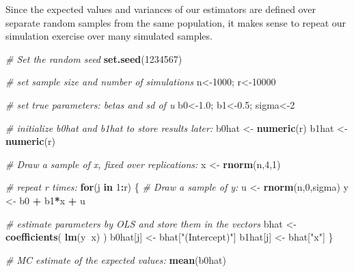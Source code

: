 \documentclass[]{book}
\newenvironment{Shaded}{\begin{snugshade}}{\end{snugshade}}
\newcommand{\CommentTok}[1]{\textcolor[rgb]{0.56,0.35,0.01}{\textit{#1}}}
\newcommand{\ControlFlowTok}[1]{\textcolor[rgb]{0.13,0.29,0.53}{\textbf{#1}}}
\newcommand{\DecValTok}[1]{\textcolor[rgb]{0.00,0.00,0.81}{#1}}
\newcommand{\FloatTok}[1]{\textcolor[rgb]{0.00,0.00,0.81}{#1}}
\newcommand{\KeywordTok}[1]{\textcolor[rgb]{0.13,0.29,0.53}{\textbf{#1}}}
\newcommand{\NormalTok}[1]{#1}
\newcommand{\OperatorTok}[1]{\textcolor[rgb]{0.81,0.36,0.00}{\textbf{#1}}}
\newcommand{\StringTok}[1]{\textcolor[rgb]{0.31,0.60,0.02}{#1}}
\begin{document}
Since the expected values and variances of our estimators are defined over separate random samples from the same population, it makes sense to repeat our simulation exercise over many simulated samples.

\begin{Shaded}
\begin{Highlighting}[]
\CommentTok{# Set the random seed}
\KeywordTok{set.seed}\NormalTok{(}\DecValTok{1234567}\NormalTok{)}

\CommentTok{# set sample size and number of simulations}
\NormalTok{n<-}\DecValTok{1000}\NormalTok{; r<-}\DecValTok{10000}

\CommentTok{# set true parameters: betas and sd of u}
\NormalTok{b0<-}\FloatTok{1.0}\NormalTok{; b1<-}\FloatTok{0.5}\NormalTok{; sigma<-}\DecValTok{2}

\CommentTok{# initialize b0hat and b1hat to store results later:}
\NormalTok{b0hat <-}\StringTok{ }\KeywordTok{numeric}\NormalTok{(r)}
\NormalTok{b1hat <-}\StringTok{ }\KeywordTok{numeric}\NormalTok{(r)}

\CommentTok{# Draw a sample of x, fixed over replications:}
\NormalTok{x <-}\StringTok{ }\KeywordTok{rnorm}\NormalTok{(n,}\DecValTok{4}\NormalTok{,}\DecValTok{1}\NormalTok{)}

\CommentTok{# repeat r times:}
\ControlFlowTok{for}\NormalTok{(j }\ControlFlowTok{in} \DecValTok{1}\OperatorTok{:}\NormalTok{r) \{}
  \CommentTok{# Draw a sample of y:}
\NormalTok{  u <-}\StringTok{ }\KeywordTok{rnorm}\NormalTok{(n,}\DecValTok{0}\NormalTok{,sigma)}
\NormalTok{  y <-}\StringTok{ }\NormalTok{b0 }\OperatorTok{+}\StringTok{ }\NormalTok{b1}\OperatorTok{*}\NormalTok{x }\OperatorTok{+}\StringTok{ }\NormalTok{u}
  
  \CommentTok{# estimate parameters by OLS and store them in the vectors}
\NormalTok{  bhat <-}\StringTok{ }\KeywordTok{coefficients}\NormalTok{( }\KeywordTok{lm}\NormalTok{(y}\OperatorTok{~}\NormalTok{x) )}
\NormalTok{  b0hat[j] <-}\StringTok{ }\NormalTok{bhat[}\StringTok{"(Intercept)"}\NormalTok{]}
\NormalTok{  b1hat[j] <-}\StringTok{ }\NormalTok{bhat[}\StringTok{"x"}\NormalTok{]}
\NormalTok{\}}
\end{Highlighting}
\end{Shaded}

\begin{Shaded}
\begin{Highlighting}[]
\CommentTok{# MC estimate of the expected values:}
\KeywordTok{mean}\NormalTok{(b0hat)}
\end{Highlighting}
\end{Shaded}
\end{document}
